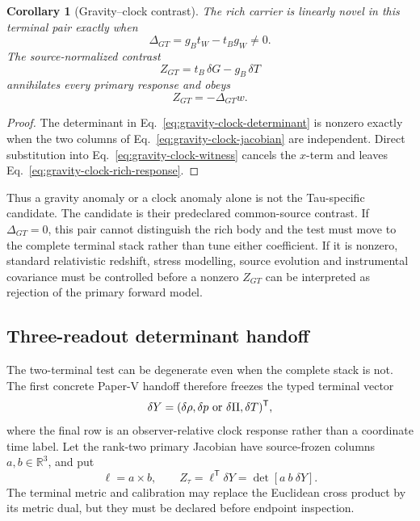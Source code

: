 \documentclass[11pt]{article}
\newtheorem{corollary}{Corollary}
\begin{document}
\begin{corollary}[Gravity--clock contrast]
The rich carrier is linearly novel in this terminal pair exactly when
\begin{equation}
 \Delta_{GT}=g_Bt_W-t_Bg_W\ne0.
 \label{eq:gravity-clock-determinant}
\end{equation}
The source-normalized contrast
\begin{equation}
 Z_{GT}=t_B\,\delta G-g_B\,\delta T
 \label{eq:gravity-clock-witness}
\end{equation}
annihilates every primary response and obeys
\begin{equation}
 Z_{GT}=-\Delta_{GT}w.
 \label{eq:gravity-clock-rich-response}
\end{equation}
\end{corollary}

\begin{proof}
The determinant in Eq.~\eqref{eq:gravity-clock-determinant} is nonzero exactly
when the two columns of Eq.~\eqref{eq:gravity-clock-jacobian} are independent.
Direct substitution into Eq.~\eqref{eq:gravity-clock-witness} cancels the
\(x\)-term and leaves Eq.~\eqref{eq:gravity-clock-rich-response}.
\end{proof}

Thus a gravity anomaly or a clock anomaly alone is not the Tau-specific
candidate. The candidate is their predeclared common-source contrast. If
\(\Delta_{GT}=0\), this pair cannot distinguish the rich body and the test
must move to the complete terminal stack rather than tune either coefficient.
If it is nonzero, standard relativistic redshift, stress modelling, source
evolution and instrumental covariance must be controlled before a nonzero
\(Z_{GT}\) can be interpreted as rejection of the primary forward model.

\subsection{Three-readout determinant handoff}

The two-terminal test can be degenerate even when the complete stack is not.
The first concrete Paper-V handoff therefore freezes the typed terminal vector
\begin{equation}
 \delta Y=(\delta\rho,\delta p\ \hbox{or}\ \delta\Pi,\delta T)^{\mathsf T},
 \label{eq:three-readout-stack}
\end{equation}
where the final row is an observer-relative clock response rather than a
coordinate time label. Let the rank-two primary Jacobian have source-frozen
columns \(a,b\in\mathbb R^3\), and put
\begin{equation}
 \ell=a\times b,
 \qquad
 Z_\tau=\ell^{\mathsf T}\delta Y
 =\det[a\ b\ \delta Y].
 \label{eq:three-readout-determinant}
\end{equation}
The terminal metric and calibration may replace the Euclidean cross product by
its metric dual, but they must be declared before endpoint inspection.
\end{document}
